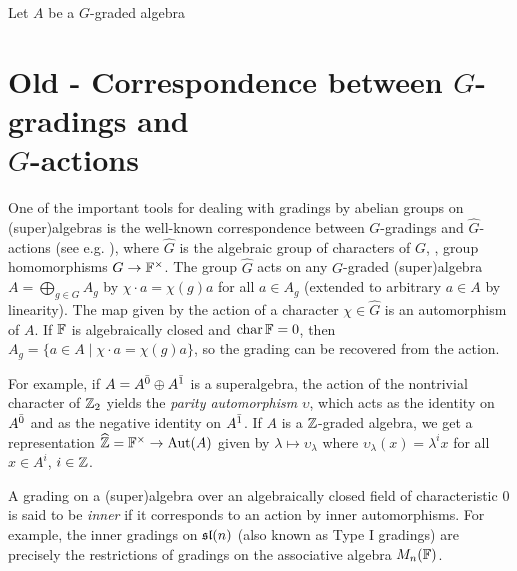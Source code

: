 \begin{ex}
    Let $A$ be a $G$-graded algebra
\end{ex}

\section{Old - Correspondence between $G$-gradings and\\ $\widehat G$-actions}\label{ssec:G-hat-action}

One of the important tools for dealing with gradings by abelian groups on (super)algebras is the well-known correspondence between  $G$-gradings and $\widehat G$-actions (see e.g. \cite[\S 1.4]{livromicha}), where $\widehat G$ is the algebraic group of characters of $G$, \ie, group homomorphisms $G \rightarrow \mathbb{F}^{\times}$. The group $\widehat{G}$ acts on any $G$-graded (super)algebra $A = \bigoplus_{g\in G} A_g$ by $\chi \cdot a = \chi(g) a$ for all $a\in A_g$ (extended to arbitrary $a\in A$ by linearity). The map given by the action of a character $\chi \in \widehat{G}$ is an automorphism of $A$. If $\mathbb{F}$ is algebraically closed and $\operatorname{char} \mathbb{F} = 0$, then $A_g = \{ a\in A \mid \chi \cdot a = \chi (g) a\}$, so the grading can be recovered from the action.

For example, if $A=A^{\bar0} \oplus A^{\bar1}$ is a superalgebra, the action of the nontrivial character of $\mathbb{Z}_2$ yields the \emph{parity automorphism} $\upsilon$, which acts as the identity on $A^{\bar0}$ and as the negative identity on $A^{\bar1}$. If $A$ is a $\mathbb{Z}$-graded algebra, we get a representation $\widehat {\mathbb{Z}} = \mathbb{F}^\times \rightarrow \operatorname{Aut} (A)$ given by $\lambda \mapsto \upsilon_\lambda$ where $\upsilon_{\lambda} (x) = \lambda^i x$ for all $x\in A^i$, $i\in \mathbb{Z}$.

A grading on a (super)algebra over an algebraically closed field of characteristic $0$ is said to be \emph{inner} if it corresponds to an action by inner automorphisms. For example, the inner gradings on $\mathfrak{sl}(n)$ (also known as Type I gradings) are precisely the restrictions of gradings on the associative algebra $M_n(\mathbb{F})$.

